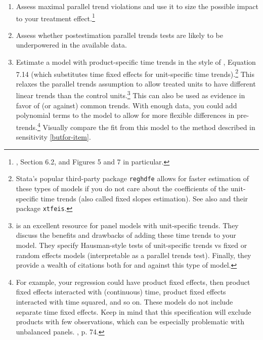 \documentclass[12pt]{article}
\begin{document}
\begin{enumerate}
\begin{enumerate}
{        \\\\
        Keep in mind the visual interpretation guidelines from \citet{roth2024a} for new estimators. In particular, the Borusyak et al. imputation estimator pre-trend coefficients should be considered separately from post-trend coefficients. \citet{roth2024a}, Section 3.3.}
        \item Assess maximal parallel trend violations and use it to size the possible impact to your treatment effect.\footnote{\citet{rambachan2023more}, Section 6.2, and Figures 5 and 7 in particular.}
        \item Assess whether postestimation parallel trends tests are likely to be underpowered in the available data.
        \item Estimate a model with product-specific time trends in the style of \citet{wooldridge2021two}, Equation 7.14 (which substitutes time fixed effects for unit-specific time trends).\footnote{Stata’s popular third-party package \texttt{reghdfe} allows for faster estimation of these types of models if you do not care about the coefficients of the unit-specific time trends (also called fixed slopes estimation). See also \citet{ruttenauer2023fixed} and their package \texttt{xtfeis}.}  This relaxes the parallel trends assumption to allow treated units to have different linear trends than the control units.\footnote{\citet{ruttenauer2023fixed} is an excellent resource for panel models with unit-specific trends. They discuss the benefits and drawbacks of adding these time trends to your model. They specify Hausman-style tests of unit-specific trends vs fixed or random effects models (interpretable as a parallel trends test). Finally, they provide a wealth of citations both for and against this type of model.}  This can also be used as evidence in favor of (or against) common trends. With enough data, you could add polynomial terms to the model to allow for more flexible differences in pre-trends.\footnote{For example, your regression could have product fixed effects, then product fixed effects interacted with (continuous) time, product fixed effects interacted with time squared, and so on. These models do not include separate time fixed effects. Keep in mind that this specification will exclude products with few observations, which can be especially problematic with unbalanced panels. \citet{ruttenauer2023fixed}, p. 74.}  Visually compare the fit from this model to the method described in sensitivity \ref{butfor-item}.
    \end{enumerate}

\end{enumerate}
\end{document}
